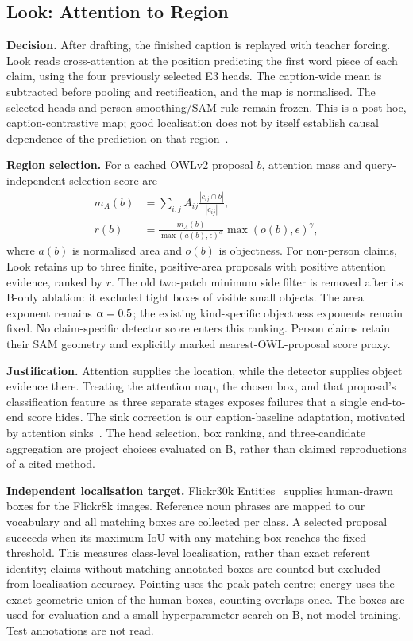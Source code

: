 \subsection{Look: Attention to Region}
\label{sec:design-look}
\textbf{Decision.} After drafting, the finished caption is replayed with teacher forcing. Look reads cross-attention at the position predicting the first word piece of each claim, using the four previously selected E3 heads. The caption-wide mean is subtracted before pooling and rectification, and the map is normalised. The selected heads and person smoothing/SAM rule remain frozen. This is a post-hoc, caption-contrastive map; good localisation does not by itself establish causal dependence of the prediction on that region~\cite{jain2019attention}.

\textbf{Region selection.} For a cached OWLv2 proposal $b$, attention mass and query-independent selection score are
\begin{align}
m_A(b)&=\sum_{i,j}A_{ij}\frac{|c_{ij}\cap b|}{|c_{ij}|},\\
r(b)&=\frac{m_A(b)}{\max(a(b),\epsilon)^{\alpha}}\max(o(b),\epsilon)^{\gamma},
\label{eq:lookv2}
\end{align}
where $a(b)$ is normalised area and $o(b)$ is objectness. For non-person claims, Look retains up to three finite, positive-area proposals with positive attention evidence, ranked by $r$. The old two-patch minimum side filter is removed after its B-only ablation: it excluded tight boxes of visible small objects. The area exponent remains $\alpha=0.5$; the existing kind-specific objectness exponents remain fixed. No claim-specific detector score enters this ranking. Person claims retain their SAM geometry and explicitly marked nearest-OWL-proposal score proxy.

\textbf{Justification.} Attention supplies the location, while the detector supplies object evidence there. Treating the attention map, the chosen box, and that proposal's classification feature as three separate stages exposes failures that a single end-to-end score hides. The sink correction is our caption-baseline adaptation, motivated by attention sinks~\cite{darcet2024vision}. The head selection, box ranking, and three-candidate aggregation are project choices evaluated on B, rather than claimed reproductions of a cited method.

\textbf{Independent localisation target.} Flickr30k Entities~\cite{plummer2015flickr30k} supplies human-drawn boxes for the Flickr8k images. Reference noun phrases are mapped to our vocabulary and all matching boxes are collected per class. A selected proposal succeeds when its maximum IoU with any matching box reaches the fixed threshold. This measures class-level localisation, rather than exact referent identity; claims without matching annotated boxes are counted but excluded from localisation accuracy. Pointing uses the peak patch centre; energy uses the exact geometric union of the human boxes, counting overlaps once. The boxes are used for evaluation and a small hyperparameter search on B, not model training. Test annotations are not read.

